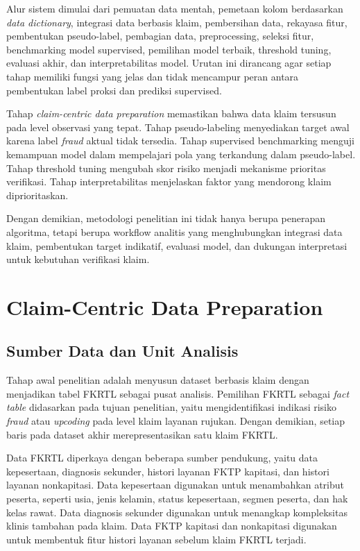 Alur sistem dimulai dari pemuatan data mentah, pemetaan kolom berdasarkan \emph{data dictionary}, integrasi data berbasis klaim, pembersihan data, rekayasa fitur, pembentukan pseudo-label, pembagian data, preprocessing, seleksi fitur, benchmarking model supervised, pemilihan model terbaik, threshold tuning, evaluasi akhir, dan interpretabilitas model. Urutan ini dirancang agar setiap tahap memiliki fungsi yang jelas dan tidak mencampur peran antara pembentukan label proksi dan prediksi supervised.

Tahap \emph{claim-centric data preparation} memastikan bahwa data klaim tersusun pada level observasi yang tepat. Tahap pseudo-labeling menyediakan target awal karena label \emph{fraud} aktual tidak tersedia. Tahap supervised benchmarking menguji kemampuan model dalam mempelajari pola yang terkandung dalam pseudo-label. Tahap threshold tuning mengubah skor risiko menjadi mekanisme prioritas verifikasi. Tahap interpretabilitas menjelaskan faktor yang mendorong klaim diprioritaskan.

Dengan demikian, metodologi penelitian ini tidak hanya berupa penerapan algoritma, tetapi berupa workflow analitis yang menghubungkan integrasi data klaim, pembentukan target indikatif, evaluasi model, dan dukungan interpretasi untuk kebutuhan verifikasi klaim.

\section{Claim-Centric Data Preparation}\label{claim-centric-data-preparation}

\subsection{Sumber Data dan Unit Analisis}\label{sumber-data-dan-unit-analisis}

Tahap awal penelitian adalah menyusun dataset berbasis klaim dengan menjadikan tabel FKRTL sebagai pusat analisis. Pemilihan FKRTL sebagai \emph{fact table} didasarkan pada tujuan penelitian, yaitu mengidentifikasi indikasi risiko \emph{fraud} atau \emph{upcoding} pada level klaim layanan rujukan. Dengan demikian, setiap baris pada dataset akhir merepresentasikan satu klaim FKRTL.

Data FKRTL diperkaya dengan beberapa sumber pendukung, yaitu data kepesertaan, diagnosis sekunder, histori layanan FKTP kapitasi, dan histori layanan nonkapitasi. Data kepesertaan digunakan untuk menambahkan atribut peserta, seperti usia, jenis kelamin, status kepesertaan, segmen peserta, dan hak kelas rawat. Data diagnosis sekunder digunakan untuk menangkap kompleksitas klinis tambahan pada klaim. Data FKTP kapitasi dan nonkapitasi digunakan untuk membentuk fitur histori layanan sebelum klaim FKRTL terjadi.

